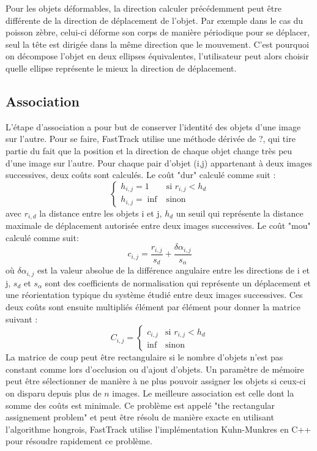 		Pour les objets déformables, la direction calculer précédemment peut être différente de la direction de déplacement de l'objet. Par exemple dans le cas du poisson zèbre, celui-ci déforme son corps de manière périodique pour se déplacer, seul la tête est dirigée dans la même direction que le mouvement. C'est pourquoi on décompose l'objet en deux ellipses équivalentes, l'utilisateur peut alors choisir quelle ellipse représente le mieux la direction de déplacement.
		
		
		\subsection{Association}
		
		L'étape d'association a pour but de conserver l'identité des objets d'une image sur l'autre. Pour se faire, FastTrack utilise une méthode dérivée de ?, qui tire partie du fait que la position et la direction de chaque objet change très peu d'une image sur l'autre.
		Pour chaque pair d'objet (i,j) appartenant à deux images successives, deux coûts sont calculés.
		Le coût "dur" calculé comme suit :
        $$
        \left\{
        	\begin{array}{ll}
        		h_{i,j} = 1 & \mbox{si } r_{i,j} < h_{d} \\
        		h_{i,j} = \inf & \mbox{sinon }
        	\end{array}
        \right.       
        $$
        avec $r_{i,d}$ la distance entre les objets i et j, $h_{d}$ un seuil qui représente la distance maximale de déplacement autorisée entre deux images successives.
		Le coût "mou" calculé comme suit:
		$$
        c_{i,j} = \frac{r_{i,j}}{s_d} + \frac{\delta\alpha_{i,j}}{s_{\alpha}}		
		$$
		où $\delta\alpha_{i,j}$ est la valeur absolue de la différence angulaire entre les directions de i et j, $s_{d}$ et $s_{\alpha}$ sont des coefficients de normalisation qui représente un déplacement et une réorientation typique du système étudié entre deux images successives.
		Ces deux coûts sont ensuite multipliés élément par élément pour donner la matrice suivant :
		$$
        C_{i,j} = \left\{
        	\begin{array}{ll}
        		c_{i,j} & \mbox{si } r_{i,j} < h_{d} \\
        		\inf & \mbox{sinon }
        	\end{array}
        \right.       
        $$
		La matrice de coup peut être rectangulaire si le nombre d'objets n'est pas constant comme lors d'occlusion ou d'ajout d'objets. Un paramètre de mémoire peut être sélectionner de manière à ne plus pouvoir assigner les objets si ceux-ci on disparu depuis plus de $n$ images.
		Le meilleure association est celle dont la somme des coûts est minimale. Ce problème est appelé "the rectangular assignement problem" et peut être résolu de manière exacte en utilisant l’algorithme hongrois, FastTrack utilise l'implémentation Kuhn-Munkres en C++ pour résoudre rapidement ce problème.
		
